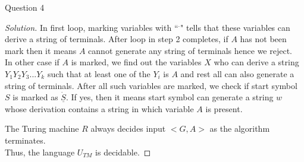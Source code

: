 \begin{solution}{Question 4}
\begin{proof}[Solution]
        In first loop, marking variables with ``$^\cdot$" tells that these variables can derive a string of terminals. After loop in step 2 completes, if $A$ has not been mark then it means $A$  cannot generate any string of terminals hence we reject.\\
        In other case if $A$ is marked, we find out the variables $X$ who can derive a string $Y_1Y_2Y_3...Y_k$ such that at least one of the $Y_i$ is $A$ and rest all can also generate a string of terminals. After all such variables are marked, we check if start symbol $S$ is marked as $\underline{\dot{S}}$. If yes, then it means start symbol can generate a string $w$ whose derivation contains a string in which variable $A$ is present.
        
        
        The Turing machine $R$ always decides input $<G, A>$ as the algorithm terminates.
        \\
        Thus, the language $U_{TM}$ is decidable.
    \end{proof}
\end{solution}
